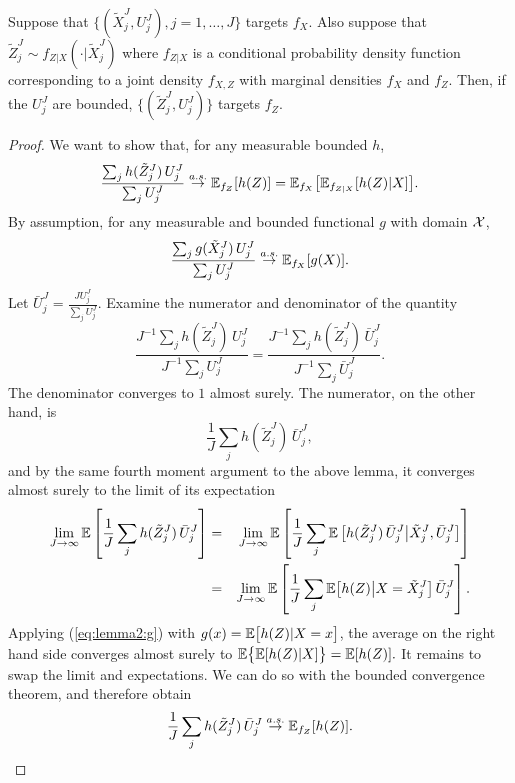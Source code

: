 \begin{lem}
    \label{lem:marginal-proper-weights}
    Suppose that $\{(\tilde X_j^J,U_j^J),j=1,\dots,J\}$ targets $f_X$. Also suppose that $\tilde Z_j^J \sim f_{Z|X}(\cdot | \tilde X_j^J)$ where $f_{Z|X}$ is a conditional probability density function corresponding to a joint density $f_{X,Z}$ with marginal densities $f_X$ and $f_Z$. Then, if the $U_j^J$ are bounded, $\{(\tilde Z_j^J,U_j^J)\}$ targets $f_Z$.
\end{lem}
\begin{proof}
    We want to show that, for any measurable bounded $h$, 
     $$\frac{\sum_j h(\tilde Z_j^J) \, U_j^J}{\sum_j U_j^J} \stackrel{a.s.}{\to} \mathbb{E}_{f_Z}[h(Z)] = \mathbb{E}_{f_X}\big[\mathbb{E}_{f_{Z|X}}[h(Z) | X]\big].$$
    By assumption, for any measurable and bounded functional $g$ with domain ${\mathcal{X}}$,
    \begin{equation}\label{eq:lemma2:g}
    \frac{\sum_j g(\tilde X_j^J)\, U_j^J}{\sum_j U_j^J} \stackrel{a.s.}{\to} \mathbb{E}_{f_X}[g(X)].
    \end{equation}
    Let $\bar{U}_j^J = \frac{J U_j^J}{\sum_j U_j^J}$. Examine the numerator and denominator of the quantity $$\frac{J^{-1}\sum_j h(\tilde Z_j^J) \, U_j^J}{J^{-1}\sum_j U_j^J} = \frac{J^{-1}\sum_j h(\tilde Z_j^J) \, \bar{U}_j^J}{J^{-1}\sum_j \bar{U}_j^J}.$$
    The denominator converges to $1$ almost surely. The numerator, on the other hand, is
    $$\frac{1}{J}\sum_j h(\tilde Z_j^J)\, \bar{U}_j^J,$$
    and by the same fourth moment argument to the above lemma, it converges almost surely to the limit of its expectation
    \begin{eqnarray*}        
    \lim_{J\to\infty} \mathbb{E}\left[\frac{1}{J}\sum_j h(\tilde Z_j^J)\, \bar{U}_j^J\right] 
    &=& \lim_{J\to\infty} \mathbb{E} \left[\frac{1}{J}\sum_j  
      \mathbb{E}\left[ h(\tilde Z_j^J)\, \bar{U}_j^J\big|\tilde X_j^J, \bar U_j^J\right]
    \right]
    \\
    &=& \lim_{J\to\infty} \mathbb{E} \left[\frac{1}{J}\sum_j  \mathbb{E}\big[h(Z) \big| X=\tilde X_j^J \big] \, \bar U_j^J\right].
    \end{eqnarray*}
    Applying (\ref{eq:lemma2:g}) with $g(x) = \mathbb{E}\big[h(Z) | X=x\big]$, the average on the right hand side converges almost surely to $\mathbb{E}\big\{\mathbb{E}[h(Z)|X]\big\}=\mathbb{E}[h(Z)].$
    It remains to swap the limit and expectations. We can do so with the bounded convergence theorem, and therefore obtain   
    $$\frac{1}{J}\sum_j h(\tilde Z_j^J)\,\bar{U}_j^J \stackrel{a.s.}{\to} \mathbb{E}_{f_Z}[h(Z)].$$ 
    
\end{proof}

